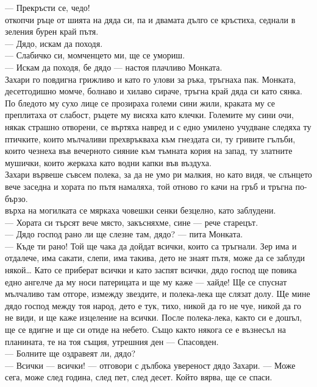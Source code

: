 \documentclass[12pt,a4paper]{article}
\begin{document}
— Прекръсти се, чедо!
\\
 откопчи ръце от шията на дяда си, па и двамата дълго се кръстиха, седнали в зеления бурен край пътя.
\\
— Дядо, искам да походя.
\\
— Слабичко си, момченцето ми, ще се умориш.
\\
— Искам да походя, бе дядо — настоя плачливо Монката.
\\
 Захари го повдигна грижливо и като го улови за ръка, тръгнаха пак. Монката, десетгодишно момче, болнаво и хилаво сираче, тръгна край дяда си като сянка. По бледото му сухо лице се прозираха големи сини жили, краката му се преплитаха от слабост, ръцете му висяха като клечки. Големите му сини очи, някак страшно отворени, се въртяха навред и с едно умилено учудване следяха ту птичките, които мълчаливи прехвръкваха към гнездата си, ту гривите гълъби, които чезнеха във вечерното сияние към тъмната кория на запад, ту златните мушички, които жеркаха като водни капки във въздуха.
\\
 Захари вървеше съвсем полека, за да не умо ри малкия, но като видя, че слънцето вече заседна и хората по пътя намаляха, той отново го качи на гръб и тръгна по-бързо.
\\
 върха на могилката се мяркаха човешки сенки безцелно, като заблудени.
\\
— Хората си търсят вече място, закъсняхме, сине — рече старецът.
\\
— Дядо господ рано ли ще слезне там, дядо? — пита Монката.
\\
— Къде ти рано! Той ще чака да дойдат всички, които са тръгнали. Зер има и отдалече, има сакати, слепи, има такива, дето не знаят пътя, може да се заблуди някой… Като се приберат всички и като заспят всички, дядо господ ще повика едно ангелче да му носи патерицата и ще му каже — хайде! Ще се спуснат мълчаливо там отгоре, измежду звездите, и полека-лека ще слязат долу. Ще мине дядо господ между тоя народ, дето е тук, тихо, никой да го не чуе, никой да го не види, и ще каже изцеление на всички. После полека-лека, както си е дошъл, ще се вдигне и ще си отиде на небето. Също както някога се е възнесъл на планината, те на тоя същия, утрешния ден — Спасовден.
\\
— Болните ще оздравеят ли, дядо?
\\
— Всички — всички! — отговори с дълбока увереност дядо Захари. — Може сега, може след година, след пет, след десет. Който вярва, ще се спаси.
\end{document}

